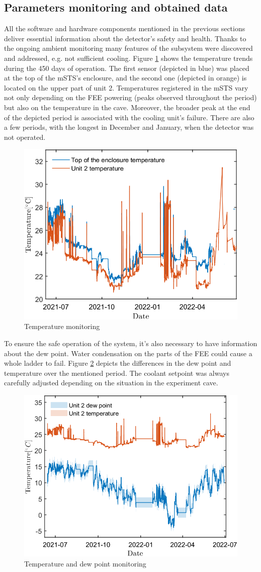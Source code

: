\subsection{Parameters monitoring and obtained data}
All the software and hardware components mentioned in the previous sections deliver essential information about the detector's safety and health. Thanks to the ongoing ambient monitoring many features of the subsystem were discovered and addressed, e.g. not sufficient cooling. Figure \ref{fig_temp} shows the temperature trends during the 450 days of operation. The first sensor (depicted in blue) was placed at the top of the \gls{mSTS}'s enclosure, and the second one (depicted in orange) is located on the upper part of unit 2. Temperatures registered in the \gls{mSTS} vary not only depending on the \gls{FEE} powering (peaks observed throughout the period) but also on the temperature in the cave. Moreover, the broader peak at the end of the depicted period is associated with the cooling unit's failure.  There are also a few periods, with the longest in December and January, when the detector was not operated. 

\begin{figure}[!h]
\centering
\includegraphics[width=0.55\columnwidth]{Chapter5/DCS/images/temp2.png}
\caption{Temperature monitoring}
\label{fig_temp}
\end{figure}

To ensure the safe operation of the system, it's also necessary to have information about the dew point. Water condensation on the parts of the \gls{FEE} could cause a whole ladder to fail. Figure \ref{fig_dew} depicts the differences in the dew point and temperature over the mentioned period. The coolant setpoint was always carefully adjusted depending on the situation in the experiment cave. 
\newpage
\begin{figure}[!h]
\centering
\includegraphics[width=0.55\columnwidth]{Chapter5/DCS/images/dew.png}
\caption{Temperature and dew point monitoring}
\label{fig_dew}
\end{figure}


